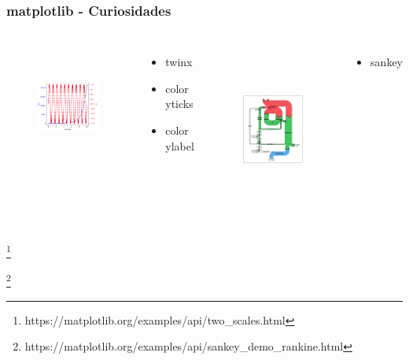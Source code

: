 \documentclass[18pt]{beamer}
\newcommand\blfootnote[1]{%
  \begingroup
  \renewcommand\thefootnote{}\footnote{#1}%
  \addtocounter{footnote}{-1}%
  \endgroup
}
\begin{document}
\begin{frame}
	
	\frametitle{matplotlib - Curiosidades}

	\begin{columns}

			\centering
			\begin{figure}
				\includegraphics[height=4.2cm]{images/matplotlib_two_scales.png}
			\end{figure}

			\vspace{-0.5cm}
			\begin{itemize}
				\item twinx
				\item color yticks
				\item color ylabel
			\end{itemize}
									
			
			\centering
			\begin{figure}
				\includegraphics[height=5.8cm]{images/matplotlib_sankey_2.png}
			\end{figure}
			
			\vspace{-0.5cm}
			\begin{itemize}
				\item sankey
			\end{itemize}
	
	\end{columns}

	\blfootnote{\scriptsize https://matplotlib.org/examples/api/two\_scales.html}
	\blfootnote{\scriptsize https://matplotlib.org/examples/api/sankey\_demo\_rankine.html}	
	
\end{frame}
\end{document}
